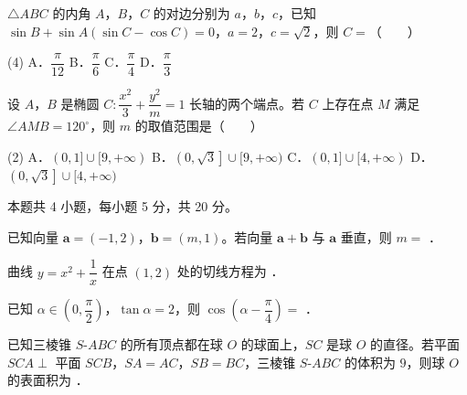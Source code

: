 \begin{question}
$\triangle ABC$ 的内角 $A$，$B$，$C$ 的对边分别为 $a$，$b$，$c$，已知 $\sin B+\sin A(\sin C-\cos C)=0$，$a=2$，$c=\sqrt2$，则 $C=$\mbox{（　　）}

\begin{gkopts}(4)
\task A．$\dfrac\pi{12}$
\task B．$\dfrac\pi6$
\task C．$\dfrac\pi4$
\task D．$\dfrac\pi3$
\end{gkopts}

\end{question}
\begin{question}
设 $A$，$B$ 是椭圆 $C:\dfrac{x^{2}}3+\dfrac{y^{2}}m=1$ 长轴的两个端点。若 $C$ 上存在点 $M$ 满足 $\angle AMB=120^\circ$，则 $m$ 的取值范围是\mbox{（　　）}

\begin{gkopts}(2)
\task A．$(0,1]\cup[9,+\infty)$
\task B．$\left(0,\sqrt3\right]\cup[9,+\infty)$
\task C．$(0,1]\cup[4,+\infty)$
\task D．$\left(0,\sqrt3\right]\cup[4,+\infty)$
\end{gkopts}

\par\medskip

\end{question}

\begin{gktip}
本题共 4 小题，每小题 5 分，共 20 分。
\end{gktip}

\begin{question}
已知向量 $\boldsymbol a=(-1,2)$，$\boldsymbol b=(m,1)$。若向量 $\boldsymbol a+\boldsymbol b$ 与 $\boldsymbol a$ 垂直，则 $m=$ \gkblank{}．

\end{question}
\begin{question}
曲线 $y=x^{2}+\dfrac1x$ 在点 $(1,2)$ 处的切线方程为 \gkblank{}．

\end{question}
\begin{question}
已知 $\alpha\in\left(0,\dfrac\pi2\right)$，$\tan\alpha=2$，则 $\cos\left(\alpha-\dfrac\pi4\right)=$ \gkblank{}．

\end{question}
\begin{question}
已知三棱锥 $S\text{-}ABC$ 的所有顶点都在球 $O$ 的球面上，$SC$ 是球 $O$ 的直径。若平面 $SCA\perp$ 平面 $SCB$，$SA=AC$，$SB=BC$，三棱锥 $S\text{-}ABC$ 的体积为 $9$，则球 $O$ 的表面积为 \gkblank{}．

\par\medskip

\end{question}

